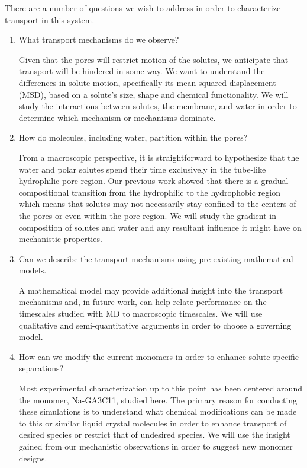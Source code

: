 \documentclass{article}
\begin{document}
  There are a number of questions we wish to address in order to characterize
  transport in this system.
  \begin{enumerate}
  
   	\item What transport mechanisms do we observe?
  	
  	Given that the pores will restrict motion of the solutes, we anticipate that 
  	transport will be hindered in some way. We want to understand the differences in
  	solute motion, specifically its mean squared displacement (MSD), based on a solute's
  	size, shape and chemical functionality. We will study the interactions
  	between solutes, the membrane, and water in order to determine which mechanism
  	or mechanisms dominate.
  
  	\item How do molecules, including water, partition within the pores?
  	
  	From a macroscopic perspective, it is straightforward to hypothesize that the water and
  	polar solutes spend their time exclusively in the tube-like hydrophilic pore region.
  	Our previous work showed that there is a gradual compositional transition from the 
  	hydrophilic to the hydrophobic region which means that solutes may not 
  	necessarily stay confined to the centers of the pores or even within the
  	pore region. We will study the gradient in composition of solutes and water
  	and any resultant influence it might have on mechanistic properties.
  	
  	\item Can we describe the transport mechanisms using pre-existing 
  	mathematical models.
  	
  	A mathematical model may provide additional insight into the transport
  	mechanisms and, in future work, can help relate performance on the 
  	timescales studied with MD to macroscopic timescales. We will use
  	qualitative and semi-quantitative arguments in order to choose a 
  	governing model. 
  	
  	\item How can we modify the current monomers in order to enhance
  	solute-specific separations? 
  	
  	Most experimental characterization up to this point has been centered 
  	around the monomer, Na-GA3C11, studied here. The primary reason for conducting
  	these simulations is to understand what chemical modifications can be made 
  	to this or similar liquid crystal molecules in order to enhance transport 
  	of desired species or restrict that of undesired species. We will use the 
  	insight gained from our mechanistic observations in order to suggest new 
  	monomer designs.
  	
  \end{enumerate} 
  
\end{document}
